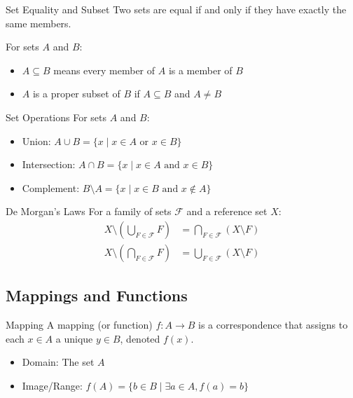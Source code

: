 \documentclass[12pt,a4paper]{article}
\begin{document}
\begin{definitionbox}{Set Equality and Subset}
Two sets are equal if and only if they have exactly the same members.

For sets $A$ and $B$:
\begin{itemize}
    \item $A \subseteq B$ means every member of $A$ is a member of $B$
    \item $A$ is a proper subset of $B$ if $A \subseteq B$ and $A \neq B$
\end{itemize}
\end{definitionbox}

\begin{definitionbox}{Set Operations}
For sets $A$ and $B$:
\begin{itemize}
    \item Union: $A \cup B = \{x \mid x \in A \text{ or } x \in B\}$
    \item Intersection: $A \cap B = \{x \mid x \in A \text{ and } x \in B\}$
    \item Complement: $B \setminus A = \{x \mid x \in B \text{ and } x \notin A\}$
\end{itemize}
\end{definitionbox}

\begin{theorembox}{De Morgan's Laws}
For a family of sets $\mathcal{F}$ and a reference set $X$:
\begin{align*}
    X \setminus \left(\bigcup_{F \in \mathcal{F}} F\right) &= \bigcap_{F \in \mathcal{F}} (X \setminus F) \\
    X \setminus \left(\bigcap_{F \in \mathcal{F}} F\right) &= \bigcup_{F \in \mathcal{F}} (X \setminus F)
\end{align*}
\end{theorembox}

\subsection{Mappings and Functions}

\begin{definitionbox}{Mapping}
A mapping (or function) $f: A \to B$ is a correspondence that assigns to each $x \in A$ a unique $y \in B$, denoted $f(x)$.
\begin{itemize}
    \item Domain: The set $A$
    \item Image/Range: $f(A) = \{b \in B \mid \exists a \in A, f(a) = b\}$
\end{itemize}
\end{definitionbox}
\end{document}

